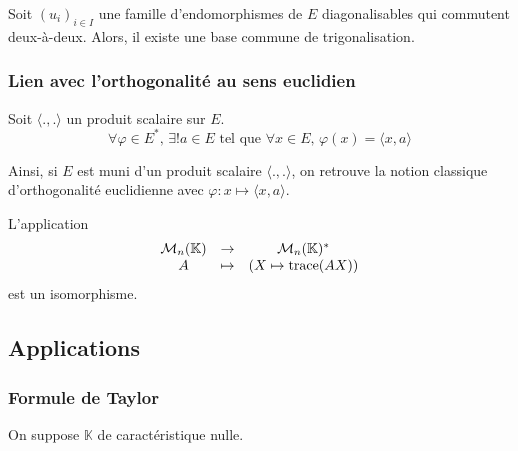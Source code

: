   
  \begin{application}
    Soit $(u_i)_{i \in I}$ une famille d'endomorphismes de $E$ diagonalisables qui commutent deux-à-deux. Alors, il existe une base commune de trigonalisation.
  \end{application}
  
  \subsubsection{Lien avec l'orthogonalité au sens euclidien}
  
  
  \begin{theorem}
    Soit $\langle ., . \rangle$ un produit scalaire sur $E$.
    \[ \forall \varphi \in E^*, \, \exists! a \in E \text{ tel que } \forall x \in E, \, \varphi(x) = \langle x, a \rangle \]
  \end{theorem}
  
  
  Ainsi, si $E$ est muni d'un produit scalaire $\langle ., . \rangle$, on retrouve la notion classique d'orthogonalité euclidienne avec $\varphi : x \mapsto \langle x, a \rangle$.
  
  
  \begin{example}
    L'application
    \[
    \begin{array}{ccc}
      \mathcal{M}_n(\mathbb{K}) &\rightarrow& \mathcal{M}_n(\mathbb{K})^* \\
      A &\mapsto& (X \mapsto \operatorname{trace}(AX))
    \end{array}
    \]
    est un isomorphisme.
  \end{example}
  
  \subsection{Applications}
  
  \subsubsection{Formule de Taylor}
  
  
  On suppose $\mathbb{K}$ de caractéristique nulle. 
  
